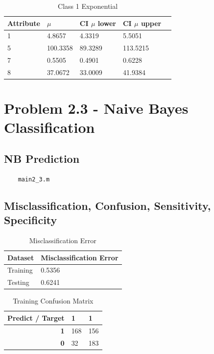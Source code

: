 \documentclass[12pt, letterpaper]{report}
\begin{document}
\begin{table}[H]
	\centering
	\begin{tabular}{ |l|l|l|l|l }
		\hline
		\textbf{Attribute} & \textbf{$\mu$} & \textbf{CI $\mu$ lower} & \textbf{CI $\mu$ upper} \\
		\hline
		1 & 4.8657 & 4.3319 & 5.5051 \\
		\hline
		5 & 100.3358 & 89.3289 & 113.5215 \\
		\hline
		7 & 0.5505 & 0.4901 & 0.6228 \\
		\hline
		8 & 37.0672 & 33.0009 & 41.9384 \\
		\hline
	\end{tabular}
	\caption{Class 1 Exponential}
\end{table}

\section{Problem 2.3 - Naive Bayes Classification}

\subsection{NB Prediction}

\begin{verbatim}
    main2_3.m
\end{verbatim}

\subsection{Misclassification, Confusion, Sensitivity, Specificity}

\begin{table}[H]
	\centering
	\begin{tabular}{ |l|l| }
		\hline
		\textbf{Dataset} & \textbf{Misclassification Error} \\
		\hline
		Training & 0.5356 \\
		\hline
		Testing & 0.6241 \\
		\hline
	\end{tabular}
	\caption{Misclassification Error}
\end{table}

\begin{table}[H]
	\centering
	\begin{tabular}{ |r|l|l| }
		\hline
		\textbf{Predict / Target} & \textbf{1} & \textbf{1} \\
		\hline
		\textbf{1} & 168 & 156 \\
		\hline
		\textbf{0} & 32 & 183 \\
		\hline
	\end{tabular}
	\caption{Training Confusion Matrix}
\end{table}
\end{document}

